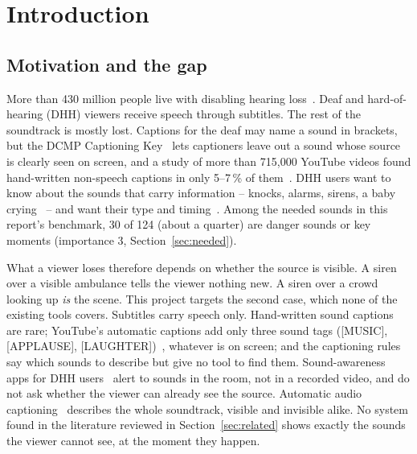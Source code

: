 \section{Introduction}\label{sec:intro}

\subsection{Motivation and the gap}\label{sec:need}
More than 430 million people live with disabling hearing loss~\cite{who2021hearing}. Deaf and hard-of-hearing (DHH) viewers receive speech through subtitles. The rest of the soundtrack is mostly lost.
Captions for the deaf may name a sound in brackets, but the DCMP Captioning Key~\cite{dcmp} lets captioners leave out a
sound whose source is clearly seen on screen, and a study of more than 715{,}000 YouTube videos
found hand-written non-speech captions in only 5--7\,\% of them~\cite{may2024unspoken}. DHH users want to know about
the sounds that carry information -- knocks, alarms, sirens, a baby crying~\cite{jain2019home,soundwatch} -- and want
their type and timing~\cite{may2025choices}. Among the needed sounds in this report's benchmark, 30 of 124 (about
a quarter) are danger sounds or key moments (importance 3, Section~\ref{sec:needed}).

What a viewer loses therefore depends on whether the source is visible. A siren over a visible ambulance tells the
viewer nothing new. A siren over a crowd looking up \emph{is} the scene. This project targets the second case, which
none of the existing tools covers. Subtitles carry speech only. Hand-written sound captions are rare; YouTube's automatic captions add only three sound tags ([MUSIC], [APPLAUSE],
[LAUGHTER])~\cite{chaudhuri2017youtube}, whatever is on screen; and the captioning rules
say which sounds to describe but give no tool to find them. Sound-awareness apps for DHH
users~\cite{soundwatch,homesound} alert to sounds in the room, not in a recorded video, and do not ask whether the
viewer can already see the source. Automatic audio captioning~\cite{drossos2017aac,kim2019audiocaps,drossos2020clotho}
describes the whole soundtrack, visible and invisible alike. No system found in the literature reviewed in
Section~\ref{sec:related} shows exactly the sounds the viewer cannot see, at the moment they happen.

